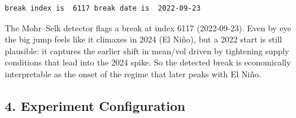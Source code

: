 \documentclass[
  letterpaper,
  DIV=11,
  numbers=noendperiod]{scrartcl}
\begin{document}
\begin{verbatim}
break index is  6117 break date is  2022-09-23 
\end{verbatim}

The Mohr--Selk detector flags a break at index 6117 (2022-09-23). Even
by eye the big jump feels like it climaxes in 2024 (El Niño), but a 2022
start is still plausible: it captures the earlier shift in mean/vol
driven by tightening supply conditions that lead into the 2024 spike. So
the detected break is economically interpretable as the onset of the
regime that later peaks with El Niño.

\subsection{4. Experiment Configuration}\label{experiment-configuration}
\end{document}
